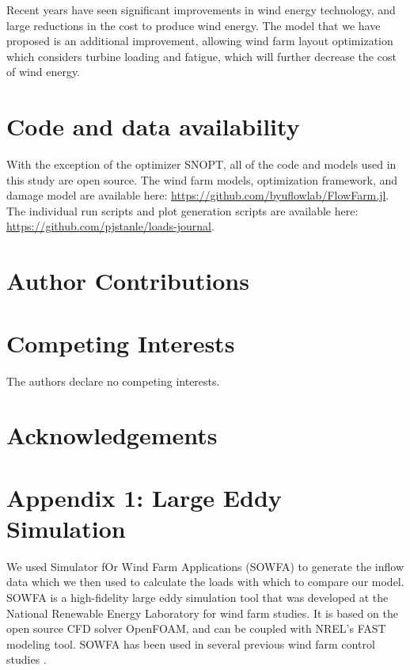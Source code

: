 \documentclass[11pt,letterpaper]{article}
\begin{document}
Recent years have seen significant improvements in wind energy technology, and large reductions in the cost to produce wind energy.
The model that we have proposed is an additional improvement, allowing wind farm layout optimization which considers turbine loading and fatigue, which will further decrease the cost of wind energy. %

\section*{Code and data availability}
With the exception of the optimizer SNOPT, all of the code and models used in this study are open source. The wind farm models, optimization framework, and damage model are available here: \url{https://github.com/byuflowlab/FlowFarm.jl}. The individual run scripts and plot generation scripts are available here: \url{https://github.com/pjstanle/loads-journal}.

\section*{Author Contributions}


\section*{Competing Interests}
The authors declare no competing interests.

\section*{Acknowledgements}

\FloatBarrier



\section*{Appendix 1: Large Eddy Simulation}
\label{sec:les}

We used Simulator fOr Wind Farm Applications (SOWFA) to generate the inflow data which we then used to calculate the loads with which to compare our model.  SOWFA is a high-fidelity large eddy simulation tool that was developed at the National Renewable Energy Laboratory for wind farm studies.  It is based on the open source CFD solver OpenFOAM, and can be coupled with NREL's FAST modeling tool.  SOWFA has been used in several previous wind farm control studies \cite{fleming2013sowfa,fleming2015simulation,gebraad2016wind}.  
\end{document}
